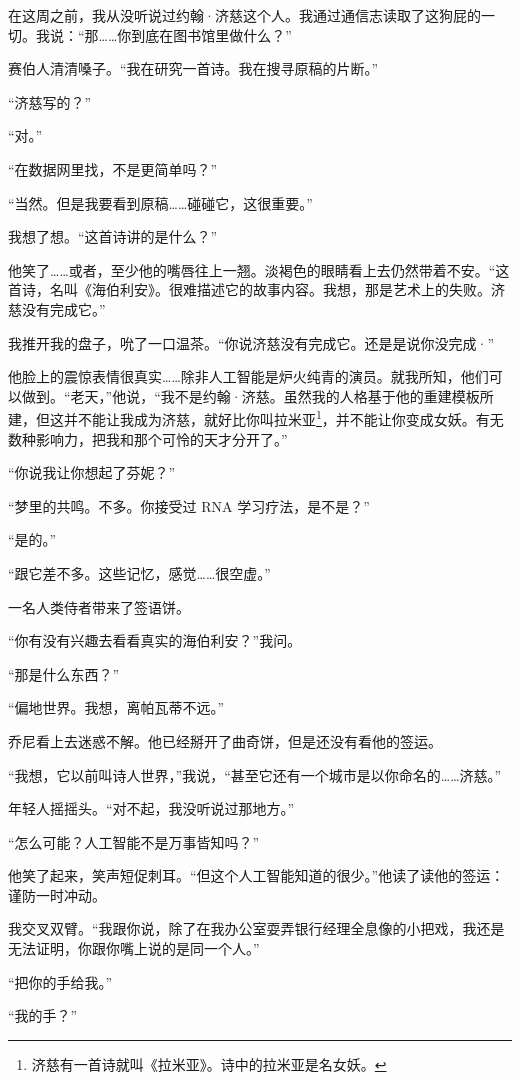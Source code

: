 \documentclass[AutoFakeBold=true]{book}
\begin{document}
在这周之前，我从没听说过约翰·济慈这个人。我通过通信志读取了这狗屁的一切。我说：``那……你到底在图书馆里做什么？''

赛伯人清清嗓子。``我在研究一首诗。我在搜寻原稿的片断。''

``济慈写的？''

``对。''

``在数据网里找，不是更简单吗？''

``当然。但是我要看到原稿……碰碰它，这很重要。''

我想了想。``这首诗讲的是什么？''

他笑了……或者，至少他的嘴唇往上一翘。淡褐色的眼睛看上去仍然带着不安。``这首诗，名叫《海伯利安》。很难描述它的故事内容。我想，那是艺术上的失败。济慈没有完成它。''

我推开我的盘子，吮了一口温茶。``你说济慈没有完成它。还是是说你没完成·''

他脸上的震惊表情很真实……除非人工智能是炉火纯青的演员。就我所知，他们可以做到。``老天，''他说，``我不是约翰·济慈。虽然我的人格基于他的重建模板所建，但这并不能让我成为济慈，就好比你叫拉米亚\footnote{济慈有一首诗就叫《拉米亚》。诗中的拉米亚是名女妖。}，并不能让你变成女妖。有无数种影响力，把我和那个可怜的天才分开了。''

``你说我让你想起了芬妮？''

``梦里的共鸣。不多。你接受过 RNA 学习疗法，是不是？''

``是的。''

``跟它差不多。这些记忆，感觉……很空虚。''

一名人类侍者带来了签语饼。

``你有没有兴趣去看看真实的海伯利安？''我问。

``那是什么东西？''

``偏地世界。我想，离帕瓦蒂不远。''

乔尼看上去迷惑不解。他已经掰开了曲奇饼，但是还没有看他的签运。

``我想，它以前叫诗人世界，''我说，``甚至它还有一个城市是以你命名的……济慈。''

年轻人摇摇头。``对不起，我没听说过那地方。''

``怎么可能？人工智能不是万事皆知吗？''

他笑了起来，笑声短促刺耳。``但这个人工智能知道的很少。''他读了读他的签运：谨防一时冲动。

我交叉双臂。``我跟你说，除了在我办公室耍弄银行经理全息像的小把戏，我还是无法证明，你跟你嘴上说的是同一个人。''

``把你的手给我。''

``我的手？''
\end{document}
